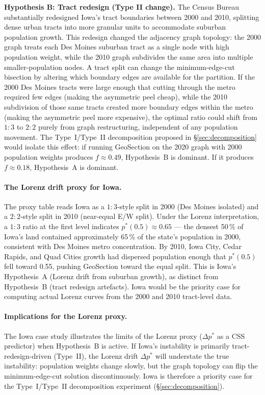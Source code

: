 \textbf{Hypothesis B: Tract redesign (Type II change).}
The Census Bureau substantially redesigned Iowa's tract boundaries between 2000
and 2010, splitting dense urban tracts into more granular units to accommodate
suburban population growth.
This redesign changed the adjacency graph topology: the 2000 graph treats
each Des Moines suburban tract as a single node with high population weight,
while the 2010 graph subdivides the same area into multiple smaller-population
nodes.
A tract split can change the minimum-edge-cut bisection by altering which
boundary edges are available for the partition.
If the 2000 Des Moines tracts were large enough that cutting through the
metro required few edges (making the asymmetric peel cheap), while the 2010
subdivision of those same tracts created more boundary edges within the metro
(making the asymmetric peel more expensive), the optimal ratio could shift
from $1:3$ to $2:2$ purely from graph restructuring, independent of any
population movement.
The Type~I/Type~II decomposition proposed in \S\ref{sec:decomposition}
would isolate this effect: if running GeoSection on the 2020 graph with
2000 population weights produces $f \approx 0.49$, Hypothesis~B is dominant.
If it produces $f \approx 0.18$, Hypothesis~A is dominant.

\paragraph{The Lorenz drift proxy for Iowa.}
The proxy table reads Iowa as a $1:3$-style split in 2000 (Des Moines isolated)
and a $2:2$-style split in 2010 (near-equal E/W split).
Under the Lorenz interpretation, a $1:3$ ratio at the first level indicates
$p^*(0.5) \approx 0.65$ --- the densest 50\,\% of Iowa's land contained
approximately 65\,\% of the state's population in 2000, consistent with
Des Moines metro concentration.
By 2010, Iowa City, Cedar Rapids, and Quad Cities growth had dispersed
population enough that $p^*(0.5)$ fell toward 0.55, pushing GeoSection
toward the equal split.
This is Iowa's Hypothesis~A (Lorenz drift from suburban growth), as distinct
from Hypothesis~B (tract redesign artefacts).
Iowa would be the priority case for computing actual Lorenz curves from the
2000 and 2010 tract-level data.

\paragraph{Implications for the Lorenz proxy.}
The Iowa case study illustrates the limits of the Lorenz proxy
($\Delta p^*$ as a CSS predictor) when Hypothesis~B is active.
If Iowa's instability is primarily tract-redesign-driven (Type~II), the
Lorenz drift $\Delta p^*$ will understate the true instability: population
weights change slowly, but the graph topology can flip the minimum-edge-cut
solution discontinuously.
Iowa is therefore a priority case for the Type~I/Type~II decomposition
experiment (\S\ref{sec:decomposition}).

